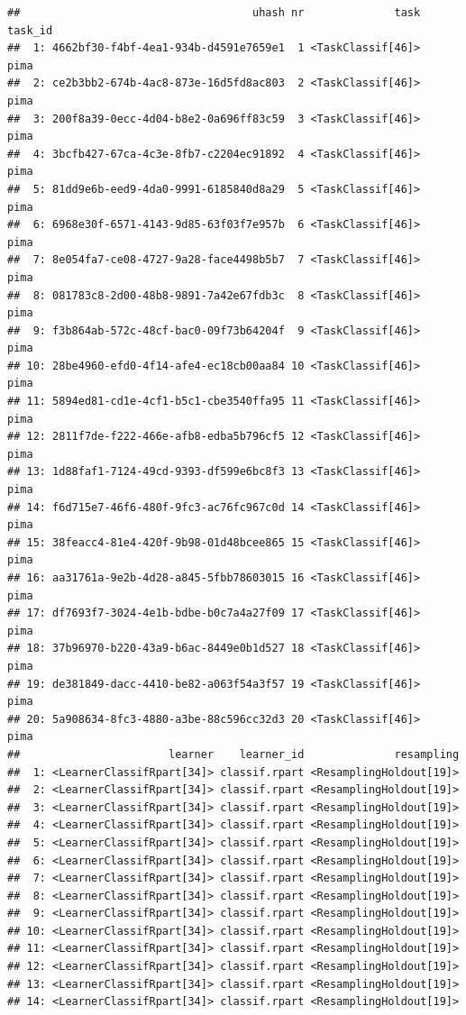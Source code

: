\documentclass[
]{scrbook}
\begin{document}
\begin{verbatim}
##                                    uhash nr              task task_id
##  1: 4662bf30-f4bf-4ea1-934b-d4591e7659e1  1 <TaskClassif[46]>    pima
##  2: ce2b3bb2-674b-4ac8-873e-16d5fd8ac803  2 <TaskClassif[46]>    pima
##  3: 200f8a39-0ecc-4d04-b8e2-0a696ff83c59  3 <TaskClassif[46]>    pima
##  4: 3bcfb427-67ca-4c3e-8fb7-c2204ec91892  4 <TaskClassif[46]>    pima
##  5: 81dd9e6b-eed9-4da0-9991-6185840d8a29  5 <TaskClassif[46]>    pima
##  6: 6968e30f-6571-4143-9d85-63f03f7e957b  6 <TaskClassif[46]>    pima
##  7: 8e054fa7-ce08-4727-9a28-face4498b5b7  7 <TaskClassif[46]>    pima
##  8: 081783c8-2d00-48b8-9891-7a42e67fdb3c  8 <TaskClassif[46]>    pima
##  9: f3b864ab-572c-48cf-bac0-09f73b64204f  9 <TaskClassif[46]>    pima
## 10: 28be4960-efd0-4f14-afe4-ec18cb00aa84 10 <TaskClassif[46]>    pima
## 11: 5894ed81-cd1e-4cf1-b5c1-cbe3540ffa95 11 <TaskClassif[46]>    pima
## 12: 2811f7de-f222-466e-afb8-edba5b796cf5 12 <TaskClassif[46]>    pima
## 13: 1d88faf1-7124-49cd-9393-df599e6bc8f3 13 <TaskClassif[46]>    pima
## 14: f6d715e7-46f6-480f-9fc3-ac76fc967c0d 14 <TaskClassif[46]>    pima
## 15: 38feacc4-81e4-420f-9b98-01d48bcee865 15 <TaskClassif[46]>    pima
## 16: aa31761a-9e2b-4d28-a845-5fbb78603015 16 <TaskClassif[46]>    pima
## 17: df7693f7-3024-4e1b-bdbe-b0c7a4a27f09 17 <TaskClassif[46]>    pima
## 18: 37b96970-b220-43a9-b6ac-8449e0b1d527 18 <TaskClassif[46]>    pima
## 19: de381849-dacc-4410-be82-a063f54a3f57 19 <TaskClassif[46]>    pima
## 20: 5a908634-8fc3-4880-a3be-88c596cc32d3 20 <TaskClassif[46]>    pima
##                       learner    learner_id              resampling
##  1: <LearnerClassifRpart[34]> classif.rpart <ResamplingHoldout[19]>
##  2: <LearnerClassifRpart[34]> classif.rpart <ResamplingHoldout[19]>
##  3: <LearnerClassifRpart[34]> classif.rpart <ResamplingHoldout[19]>
##  4: <LearnerClassifRpart[34]> classif.rpart <ResamplingHoldout[19]>
##  5: <LearnerClassifRpart[34]> classif.rpart <ResamplingHoldout[19]>
##  6: <LearnerClassifRpart[34]> classif.rpart <ResamplingHoldout[19]>
##  7: <LearnerClassifRpart[34]> classif.rpart <ResamplingHoldout[19]>
##  8: <LearnerClassifRpart[34]> classif.rpart <ResamplingHoldout[19]>
##  9: <LearnerClassifRpart[34]> classif.rpart <ResamplingHoldout[19]>
## 10: <LearnerClassifRpart[34]> classif.rpart <ResamplingHoldout[19]>
## 11: <LearnerClassifRpart[34]> classif.rpart <ResamplingHoldout[19]>
## 12: <LearnerClassifRpart[34]> classif.rpart <ResamplingHoldout[19]>
## 13: <LearnerClassifRpart[34]> classif.rpart <ResamplingHoldout[19]>
## 14: <LearnerClassifRpart[34]> classif.rpart <ResamplingHoldout[19]>

\end{verbatim}
\end{document}

